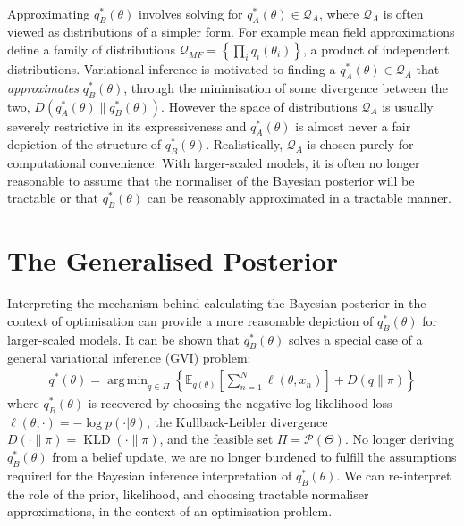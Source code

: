 \documentclass[twoside,11pt]{article}
\newcommand{\KLD}{\operatorname{KLD}}
\DeclareMathOperator*{\argmin}{arg\,min}
\begin{document}
\newline
\\Approximating $q_B^*(\theta)$ involves solving for $q_A^*(\theta) \in \mathcal{Q}_{A}$, where $\mathcal{Q}_{A}$ is often viewed as distributions of a simpler form. For example mean field approximations define a family of distributions $\mathcal{Q}_{MF} = \left\{\prod_i q_i(\theta_i)\right\}$, a product of independent distributions. Variational inference is motivated to finding a $q_A^*(\theta) \in \mathcal{Q}_{A}$ that \textit{approximates} $q_B^*(\theta)$, through the minimisation of some divergence between the two, $D(q_A^*(\theta)\| q_B^*(\theta))$. However the space of distributions $\mathcal{Q}_{A}$ is usually severely restrictive in its expressiveness and $q_A^*(\theta)$ is almost never a fair depiction of the structure of $q_B^*(\theta)$. Realistically, $\mathcal{Q}_{A}$ is chosen purely for computational convenience. With larger-scaled models, it is often no longer reasonable to assume that the normaliser of the Bayesian posterior will be tractable or that $q_B^*(\theta)$ can be reasonably approximated in a tractable manner.

\section{The Generalised Posterior \cite{knoblauch2022optimization}}
Interpreting the mechanism behind calculating the Bayesian posterior in the context of optimisation can provide a more reasonable depiction of $q_B^*(\theta)$ for larger-scaled models. It can be shown that $q_B^*(\theta)$ solves a special case of a general variational inference (GVI) problem:
\begin{align}
q^*(\theta) = \argmin_{q \in \Pi} \left\{ \mathbb{E}_{q(\theta)}\left[\sum_{n=1}^N \ell(\theta, x_n)\right] + D(q\|\pi)\right\}
\label{general-posterior}
\end{align}
where $q_B^*(\theta)$ is recovered by choosing the negative log-likelihood loss $\ell(\theta, \cdot) = -\log p(\cdot | \theta)$, the Kullback-Leibler divergence $D(\cdot \| \pi) = \KLD(\cdot \| \pi)$, and the feasible set $\Pi = \mathcal{P}(\Theta)$. No longer deriving $q_B^*(\theta)$ from a belief update, we are no longer burdened to fulfill the assumptions required for the Bayesian inference interpretation of $q_B^*(\theta)$. We can re-interpret the role of the prior, likelihood, and choosing tractable normaliser approximations, in the context of an optimisation problem.
\end{document}
